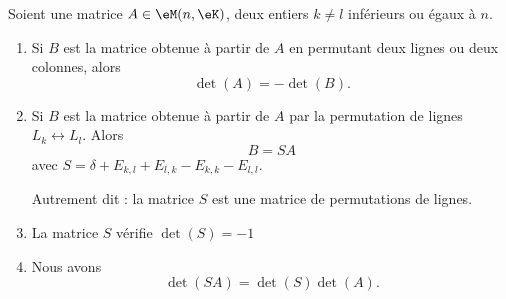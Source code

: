 \begin{proposition}    \label{PROPooFQRDooRPfuxk}
	Soient une matrice \( A\in \eM(n,\eK)\), deux entiers \( k\neq l\) inférieurs ou égaux à \( n\).
	\begin{enumerate}
		\item   \label{ITEMooAIHWooHXzeys}
		      Si \( B\) est la matrice obtenue à partir de \( A\) en permutant deux lignes ou deux colonnes, alors
		      \begin{equation}
			      \det(A)=-\det(B).
		      \end{equation}
		\item   \label{ITEMooDNHWooOMgmxa}
		      Si \( B\) est la matrice obtenue à partir de \( A\) par la permutation de lignes \( L_k\leftrightarrow L_l\). Alors
		      \begin{equation}
			      B=SA
		      \end{equation}
		      avec \( S=\delta+E_{k,l}+E_{l,k}-E_{k,k}-E_{l,l}\).

		      Autrement dit : la matrice \( S\) est une matrice de permutations de lignes.
		\item   \label{ITEMooSHRQooQrqVdO}
		      La matrice \( S\) vérifie \( \det(S)=-1\)
		\item   \label{ITEMooQXSEooMWiKbL}
		      Nous avons
		      \begin{equation}
			      \det(SA)=\det(S)\det(A).
		      \end{equation}
	\end{enumerate}
\end{proposition}


